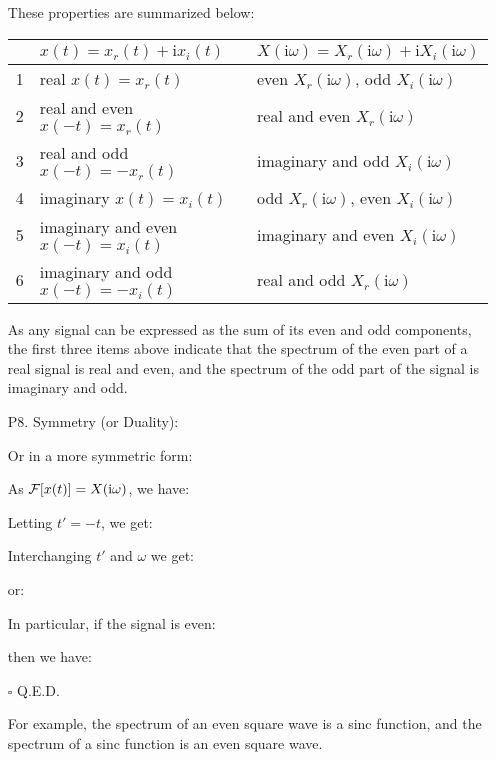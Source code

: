 \begin{itemize}
	These properties are summarized below:
	\vskip 0.1in
	\begin{table}[H]
		\centering
		\begin{tabular}{l|l|l} \hline
		  & $x(t)=x_r(t)+\mathrm{i}x_i(t)$	& $X(\mathrm{i}\omega)=X_r(\mathrm{i}\omega)+\mathrm{i}X_i(\mathrm{i}\omega)$	\\ \hline
		1 & real $x(t)=x_r(t)$ 		& even $X_r(\mathrm{i}\omega)$, odd $X_i(\mathrm{i}\omega)$ \\
		2 & real and even $x(-t)=x_r(t)$ 	& real and even $X_r(\mathrm{i}\omega)$ \\
		3 & real and odd $x(-t)=-x_r(t)$ 	& imaginary and odd $X_i(\mathrm{i}\omega)$ \\
		4 & imaginary $x(t)=x_i(t)$  	& odd $X_r(\mathrm{i}\omega)$, even $X_i(\mathrm{i}\omega)$ \\ 
		5 & imaginary and even $x(-t)=x_i(t)$ 	& imaginary and even $X_i(\mathrm{i}\omega)$ \\
		6 & imaginary and odd $x(-t)=-x_i(t)$ 	& real and odd $X_r(\mathrm{i}\omega)$ \\ \hline
		\end{tabular}
	\end{table}
	
	As any signal can be expressed as the sum of its even and odd components, the 
	first three items above indicate that the spectrum of the even part of a real
	signal is real and even, and the spectrum of the odd part of the signal is 
	imaginary and odd. 
	
	\item[P8.] Symmetry (or Duality):
	
	
	Or in a more symmetric form:
	
	\begin{dem} As ${\cal F}[x(t)]=X(\mathrm{i}\omega)$, we have:
	
	Letting $t'=-t$, we get:
	
	Interchanging $t'$ and $\omega$ we get:
	
	or:
	
	In particular, if the signal is even:
	
	then we have:
	
	\begin{flushright}
		$\square$  Q.E.D.
	\end{flushright}
	\end{dem}
	For example, the spectrum of an even square wave is a sinc function, and the
	spectrum of a sinc function is an even square wave. 
	

\end{itemize}
